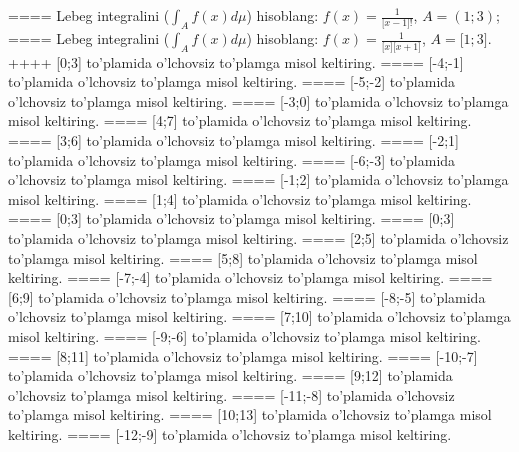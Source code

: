 ====
Lebeg integralini (\(\int_{A}^{}{f(x)d\mu}\)) hisoblang: \(f(x) = \frac{1}{\lbrack x - 1\rbrack!}\), \(A = (1;3)\);
====
Lebeg integralini (\(\int_{A}^{}{f(x)d\mu}\)) hisoblang: \(f(x) = \frac{1}{\lbrack x\rbrack\lbrack x + 1\rbrack}\), \(A = \lbrack 1;3\rbrack\).
++++
[0;3] to'plamida o'lchovsiz to'plamga misol keltiring.
====
[-4;-1] to'plamida o'lchovsiz to'plamga misol keltiring.
====
[-5;-2] to'plamida o'lchovsiz to'plamga misol keltiring.
====
[-3;0] to'plamida o'lchovsiz to'plamga misol keltiring.
====
[4;7] to'plamida o'lchovsiz to'plamga misol keltiring.
====
[3;6] to'plamida o'lchovsiz to'plamga misol keltiring.
====
[-2;1] to'plamida o'lchovsiz to'plamga misol keltiring.
====
[-6;-3] to'plamida o'lchovsiz to'plamga misol keltiring.
====
[-1;2] to'plamida o'lchovsiz to'plamga misol keltiring.
====
[1;4] to'plamida o'lchovsiz to'plamga misol keltiring.
====
[0;3] to'plamida o'lchovsiz to'plamga misol keltiring.
====
[0;3] to'plamida o'lchovsiz to'plamga misol keltiring.
====
[2;5] to'plamida o'lchovsiz to'plamga misol keltiring.
====
[5;8] to'plamida o'lchovsiz to'plamga misol keltiring.
====
[-7;-4] to'plamida o'lchovsiz to'plamga misol keltiring.
====
[6;9] to'plamida o'lchovsiz to'plamga misol keltiring.
====
[-8;-5] to'plamida o'lchovsiz to'plamga misol keltiring.
====
[7;10] to'plamida o'lchovsiz to'plamga misol keltiring.
====
[-9;-6] to'plamida o'lchovsiz to'plamga misol keltiring.
====
[8;11] to'plamida o'lchovsiz to'plamga misol keltiring.
====
[-10;-7] to'plamida o'lchovsiz to'plamga misol keltiring.
====
[9;12] to'plamida o'lchovsiz to'plamga misol keltiring.
====
[-11;-8] to'plamida o'lchovsiz to'plamga misol keltiring.
====
[10;13] to'plamida o'lchovsiz to'plamga misol keltiring.
====
[-12;-9] to'plamida o'lchovsiz to'plamga misol keltiring.
